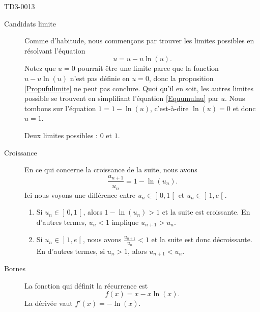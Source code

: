 
\begin{corrige}{TD3-0013}

    \begin{description}
        \item[Candidats limite] 

    Comme d'habitude, nous commençons par trouver les limites possibles en résolvant l'équation
    \begin{equation}        \label{Equumulnu}
        u=u-u\ln(u).
    \end{equation}
    Notez que $u=0$ pourrait être une limite parce que la fonction $u-u\ln(u)$ n'est pas définie en $u=0$, donc la proposition \ref{Propufulimite} ne peut pas conclure. Quoi qu'il en soit, les autres limites possible se trouvent en simplifiant l'équation \eqref{Equumulnu} par $u$. Nous tombons sur l'équation $1=1-\ln(u)$, c'est-à-dire $\ln(u)=0$ et donc $u=1$.

    Deux limites possibles : $0$ et $1$.

        \item[Croissance]

    En ce qui concerne la croissance de la suite, nous avons
    \begin{equation}
        \frac{ u_{n+1} }{ u_n }=1-\ln(u_n).
    \end{equation}
    Ici nous voyons une différence entre $u_n\in\mathopen] 0 , 1 \mathclose[$ et $u_n\in\mathopen] 1 , e \mathclose[$. 
    
    \begin{enumerate}
        \item
            Si $u_n\in\mathopen] 0 , 1 \mathclose[$, alors $1-\ln(u_n)>1$ et la suite est croissante. En d'autres termes, \( u_n<1\) implique \( u_{n+1}>u_n\).

        \item
            Si $u_n\in\mathopen] 1 , e \mathclose[$, nous avons $\frac{ u_{n+1} }{ u_n }<1$ et la suite est donc décroissante. En d'autres termes, si \( u_n>1\), alors \( u_{n+1}<u_n\).
    
            
    \end{enumerate}

        \item[Bornes]

            La fonction qui définit la récurrence est
            \begin{equation}
                f(x)=x-x\ln(x).
            \end{equation}
            La dérivée vaut \( f'(x)=-\ln(x)\).


\end{description}
\end{corrige}
